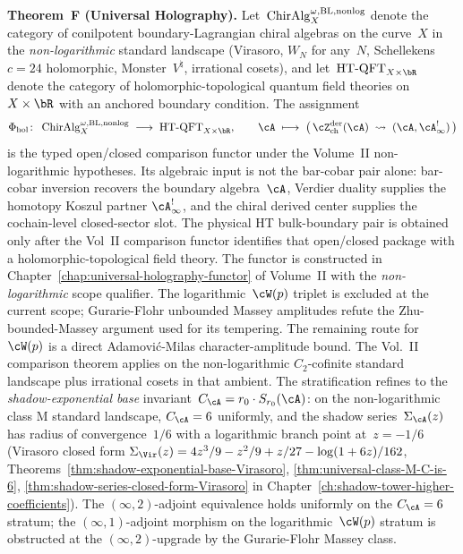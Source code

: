 \noindent\textbf{Theorem~F (Universal Holography).}\enspace
Let~$\operatorname{ChirAlg}^{\omega,\mathrm{BL},\mathrm{nonlog}}_X$ denote the
category of conilpotent boundary-Lagrangian chiral algebras on the
curve~$X$ in the \emph{non-logarithmic} standard landscape
(Virasoro, $W_N$ for any~$N$, Schellekens $c=24$ holomorphic,
Monster~$V^{\natural}$, irrational cosets), and
let~$\HTQFT_{X\times\bR}$ denote the category of
holomorphic-topological quantum field theories
on~$X\times\bR$ with an anchored boundary condition. The assignment
\[
 \Phihol\colon\;
 \ChirAlg^{\omega,\mathrm{BL},\mathrm{nonlog}}_X
 \;\longrightarrow\;
 \HTQFT_{X\times\bR},
 \qquad
 \cA \;\longmapsto\;
 \bigl(\,\cZ^{\mathrm{der}}_{\mathrm{ch}}(\cA)
 \;\rightsquigarrow\;
 (\cA,\cA^{!}_\infty)\,\bigr)
\]
is the typed open/closed comparison functor under the
Volume~II non-logarithmic hypotheses.  Its algebraic input is not the
bar-cobar pair alone: bar-cobar inversion recovers the boundary
algebra~$\cA$, Verdier duality supplies the homotopy Koszul partner
$\cA^!_\infty$, and the chiral derived center supplies the
cochain-level closed-sector slot.  The physical HT bulk-boundary pair is
obtained only after the Vol~II comparison functor identifies that
open/closed package with a holomorphic-topological field theory.
The functor is constructed in
Chapter~\ref{chap:universal-holography-functor} of Volume~II with the
\emph{non-logarithmic} scope qualifier. The logarithmic~$\cW(p)$
triplet is excluded at the current scope; Gurarie-Flohr unbounded
Massey amplitudes refute the Zhu-bounded-Massey argument used for its
tempering. The remaining route for~$\cW(p)$ is a direct
Adamovi\'c-Milas character-amplitude bound. The Vol.~II comparison
theorem applies on the non-logarithmic $C_2$-cofinite standard
landscape plus irrational cosets in that ambient.
The stratification refines to the \emph{shadow-exponential base}
invariant~$C_\cA = r_0 \cdot S_{r_0}(\cA)$: on the non-logarithmic
class M standard landscape, $C_\cA = 6$ uniformly, and the shadow
series~$\Sigma_\cA(z)$ has radius of convergence~$1/6$ with a
logarithmic branch point at~$z = -1/6$ (Virasoro closed form
$\Sigma_\Vir(z) = 4 z^3/9 - z^2/9 + z/27 - \log(1+6z)/162$,
Theorems~\ref{thm:shadow-exponential-base-Virasoro},
\ref{thm:universal-class-M-C-is-6},
\ref{thm:shadow-series-closed-form-Virasoro} in
Chapter~\ref{ch:shadow-tower-higher-coefficients}). The
$(\infty, 2)$-adjoint equivalence holds uniformly on the
$C_\cA = 6$ stratum; the $(\infty, 1)$-adjoint morphism on the
logarithmic~$\cW(p)$ stratum is obstructed at the
$(\infty, 2)$-upgrade by the Gurarie-Flohr Massey class.

